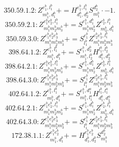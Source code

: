 \documentclass[letterpaper,10pt,fleqn,leqno,onecolumn]{article}
\begin{document}
\begin{equation} \;\;\;\;\;\;  350.59.1.2: Z^{e_{1}^{b},l_{1}^{b}}_{m_{1}^{b},d_{1}^{b}}+=H^{e_{1}^{b},l_{1}^{b}}_{d_{1}^{b},d_{2}^{b}}S^{d_{2}^{b}}_{m_{1}^{b}}\cdot -1. \end{equation}
\begin{equation} \;\;\;\;\;\;  350.59.2.1: Z^{e_{1}^{b}e_{2}^{b},l_{1}^{b}}_{m_{1}^{b}m_{2}^{b}m_{3}^{b}}+=S^{e_{1}^{b},d_{1}^{b}}_{m_{1}^{b}m_{2}^{b}}Z^{e_{2}^{b},l_{1}^{b}}_{m_{3}^{b},d_{1}^{b}} \end{equation}
\begin{equation} \;\;\;\;\;\;  350.59.3.0: Z^{e_{1}^{b}e_{2}^{b}e_{3}^{b}}_{m_{1}^{b}m_{2}^{b}m_{3}^{b}}+=S^{e_{1}^{b}}_{l_{1}^{b}}Z^{e_{2}^{b}e_{3}^{b},l_{1}^{b}}_{m_{1}^{b}m_{2}^{b}m_{3}^{b}} \end{equation}
\begin{equation} \;\;\;\;\;\;  398.64.1.2: Z^{e_{1}^{b},l_{1}^{b}}_{m_{1}^{b},d_{1}^{b}}+=S^{e_{1}^{b},d_{2}^{b}}_{m_{1}^{b},l_{2}^{b}}H^{l_{1}^{b},l_{2}^{b}}_{d_{1}^{b},d_{2}^{b}} \end{equation}
\begin{equation} \;\;\;\;\;\;  398.64.2.1: Z^{e_{1}^{b}e_{2}^{b},l_{1}^{b}}_{m_{1}^{b}m_{2}^{b}m_{3}^{b}}+=S^{e_{1}^{b},d_{1}^{b}}_{m_{1}^{b}m_{2}^{b}}Z^{e_{2}^{b},l_{1}^{b}}_{m_{3}^{b},d_{1}^{b}} \end{equation}
\begin{equation} \;\;\;\;\;\;  398.64.3.0: Z^{e_{1}^{b}e_{2}^{b}e_{3}^{b}}_{m_{1}^{b}m_{2}^{b}m_{3}^{b}}+=S^{e_{1}^{b}}_{l_{1}^{b}}Z^{e_{2}^{b}e_{3}^{b},l_{1}^{b}}_{m_{1}^{b}m_{2}^{b}m_{3}^{b}} \end{equation}
\begin{equation} \;\;\;\;\;\;  402.64.1.2: Z^{e_{1}^{b},l_{1}^{b}}_{m_{1}^{b},d_{1}^{b}}+=S^{e_{1}^{b},d_{1}^{a}}_{m_{1}^{b},l_{1}^{a}}H^{l_{1}^{b},l_{1}^{a}}_{d_{1}^{b},d_{1}^{a}} \end{equation}
\begin{equation} \;\;\;\;\;\;  402.64.2.1: Z^{e_{1}^{b}e_{2}^{b},l_{1}^{b}}_{m_{1}^{b}m_{2}^{b}m_{3}^{b}}+=S^{e_{1}^{b},d_{1}^{b}}_{m_{1}^{b}m_{2}^{b}}Z^{e_{2}^{b},l_{1}^{b}}_{m_{3}^{b},d_{1}^{b}} \end{equation}
\begin{equation} \;\;\;\;\;\;  402.64.3.0: Z^{e_{1}^{b}e_{2}^{b}e_{3}^{b}}_{m_{1}^{b}m_{2}^{b}m_{3}^{b}}+=S^{e_{1}^{b}}_{l_{1}^{b}}Z^{e_{2}^{b}e_{3}^{b},l_{1}^{b}}_{m_{1}^{b}m_{2}^{b}m_{3}^{b}} \end{equation}
\begin{equation} \;\;\;\;\;\;  172.38.1.1: Z^{e_{1}^{b}e_{2}^{b}}_{m_{1}^{b},d_{1}^{b}}+=H^{e_{1}^{b}e_{2}^{b}}_{d_{1}^{b},d_{2}^{b}}S^{d_{2}^{b}}_{m_{1}^{b}} \end{equation}
\end{document}
